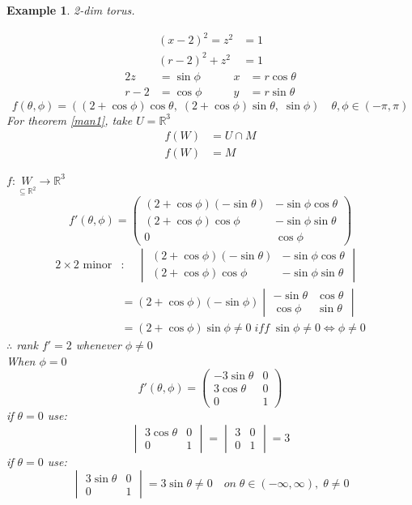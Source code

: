 \documentclass[12pt]{article}
\def\RR{\mathbb{R}}
\newtheorem{example}{Example}[section]
\begin{document}
\begin{example}2-dim torus.

\begin{align*}
(x-2)^2 = z^2 &=1\\
(r-2)^2 + z^2 &= 1 \end{align*}
\begin{alignat*}{2}
z&=\sin\phi &\qquad x&=r\cos\theta\\
r-2&=\cos\phi &\qquad y&=r\sin\theta
\end{alignat*}
\[f(\theta,\phi)= ((2+\cos\phi)\cos\theta, \; (2+\cos\phi)\sin\theta, \; \sin\phi) \quad \theta, \phi \in (-\pi , \pi )\]
For theorem \ref{man1}, take $U=\RR^3$
\begin{align*}
f(W) &= U\cap M\\
f(W) &= M
\end{align*}

$f:\underset{\subseteq \RR^2}{W} \rightarrow \RR^3$
\[f'(\theta, \phi) = \begin{pmatrix}  (2+\cos\phi)(-\sin\theta) &-\sin\phi \cos\theta \\
(2+\cos\phi)\cos\phi & -\sin\phi \sin\theta\\
0 & \cos\phi \end{pmatrix}\]
\begin{align*} 2 \times 2\text{ minor}&: \quad \begin{vmatrix}  (2+\cos\phi)(-\sin\theta) &-\sin\phi \cos\theta \\
(2+\cos\phi)\cos\phi & -\sin\phi \sin\theta \end{vmatrix}\\ &= (2+\cos\phi)(-\sin\phi) \begin{vmatrix}  -\sin\theta & \cos\theta \\ \cos\phi &  \sin\theta \end{vmatrix}\\
&=  (2+\cos\phi)\sin\phi \neq 0 \; iff\; \sin\phi \neq 0 \Leftrightarrow \phi \neq 0\end{align*}
$\therefore$ rank $f' = 2$ whenever $\phi \neq 0$\\
When $\phi =0$ 
\[f'(\theta, \phi) = \begin{pmatrix} -3\sin\theta & 0\\ 3\cos\theta & 0 \\ 0 & 1 \end{pmatrix}\]
if $\theta = 0$ use:
\[\begin{vmatrix} 3\cos\theta & 0 \\ 0 & 1 \end{vmatrix} = \begin{vmatrix} 3 & 0 \\ 0 & 1 \end{vmatrix} = 3\]
if $\theta = 0$ use:
\[\begin{vmatrix} 3\sin\theta & 0 \\ 0 & 1 \end{vmatrix} = 3\sin\theta \neq 0 \quad on \; \theta\in (-\infty, \infty), \; \theta \neq 0\]
\end{example}
\end{document}
